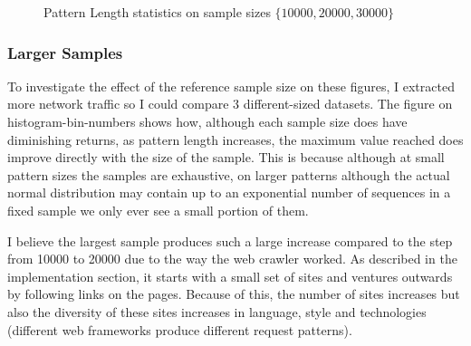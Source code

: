 \documentclass[ %
                    author={Samuel Russell},
                supervisor={Prof. Bogdan Warinschi},
                    degree={MEng},
                     title={Innocuous Ciphertexts},
                  subtitle={The DE-CENSOR Scheme},
                      type={Research},
                      year={2018} ]{dissertation}
\begin{document}
\begin{figure}[h]
\begin{subfigure}[b]{.49\linewidth}
\end{subfigure}
\caption{Pattern Length statistics on sample sizes $\{10000, 20000, 30000\}$}
\end{figure}


\subsubsection{Larger Samples}

To investigate the effect of the reference sample size on these figures, I extracted more network traffic so I could compare 3 different-sized datasets.
The figure on histogram-bin-numbers shows how, although each sample size does have diminishing returns, as pattern length increases, the maximum value reached does improve directly with the size of the sample. This is because although at small pattern sizes the samples are exhaustive, on larger patterns although the actual normal distribution may contain up to an exponential number of sequences in a fixed sample we only ever see a small portion of them.

I believe the largest sample produces such a large increase compared to the step from 10000 to 20000 due to the way the web crawler worked.
As described in the implementation section, it starts with a small set of sites and ventures outwards by following links on the pages.
Because of this, the number of sites increases but also the diversity of these sites increases in language, style and technologies (different web frameworks produce different request patterns).
\end{document}
